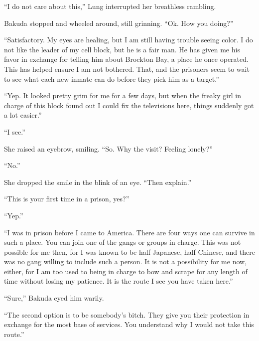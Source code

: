 ``I do not care about this,'' Lung interrupted her breathless rambling.



Bakuda stopped and wheeled around, still grinning.  ``Ok.  How you doing?''



``Satisfactory.  My eyes are healing, but I am still having trouble seeing color.  I do not like the leader of my cell block, but he is a fair man.  He has given me his favor in exchange for telling him about Brockton Bay, a place he once operated.  This has helped ensure I am not bothered.  That, and the prisoners seem to wait to see what each new inmate can do before they pick him as a target.''



``Yep.  It looked pretty grim for me for a few days, but when the freaky girl in charge of this block found out I could fix the televisions here, things suddenly got a lot easier.''



``I see.''



She raised an eyebrow, smiling.  ``So.  Why the visit?  Feeling lonely?''



``No.''



She dropped the smile in the blink of an eye.  ``Then explain.''



``This is your first time in a prison, yes?''



``Yep.''



``I was in prison before I came to America.  There are four ways one can survive in such a place.  You can join one of the gangs or groups in charge.  This was not possible for me then, for I was known to be half Japanese, half Chinese, and there was no gang willing to include such a person.  It is not a possibility for me now, either, for I am too used to being in charge to bow and scrape for any length of time without losing my patience.  It is the route I see you have taken here.''



``Sure,'' Bakuda eyed him warily.



``The second option is to be somebody's bitch.  They give you their protection in exchange for the most base of services.  You understand why I would not take this route.''



